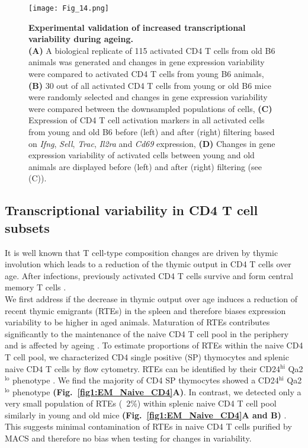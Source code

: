 \newpage

\begin{figure}[!ht]
\centering
\texttt{[image: Fig\_14.png]}
\caption[Experimental validation of increased transcriptional variability during ageing]{\textbf{Experimental validation of increased transcriptional variability during ageing.} \\
\textbf{(A)} A biological replicate of 115 activated CD4\plus{} T cells from old B6 animals was generated and changes in gene expression variability were compared to activated CD4\plus{} T cells from young B6 animals, \textbf{(B)} 30 out of all activated CD4\plus{} T cells from young or old B6 mice were randomly selected and changes in gene expression variability were compared between the downsampled populations of cells, \textbf{(C)} Expression of CD4\plus{} T cell activation markers in all activated cells from young and old B6 before (left) and after (right) filtering based on \textit{Ifng}, \textit{Sell}, \textit{Trac}, \textit{Il2ra} and \textit{Cd69} expression, \textbf{(D)} Changes in gene expression variability of activated cells between young and old animals are displayed before (left) and after (right) filtering (see (C)).}
\label{fig1:validation}
\end{figure}

\newpage

\subsection{Transcriptional variability in CD4\plus{} T cell subsets}

It is well known that T cell-type composition changes are driven by thymic involution which leads to a reduction of the thymic output in CD4\plus{} T cells over age. After infections, previously activated CD4\plus{} T cells survive and form central memory T cells \cite{Moro-Garcia2013}.\\

We first address if the decrease in thymic output over age induces a reduction of recent thymic emigrants (RTEs) in the spleen and therefore biases expression variability to be higher in aged animals. Maturation of RTEs contributes significantly to the maintenance of the naive CD4\plus{} T cell pool in the periphery and is affected by ageing \citep{Boursalian2004, Hale2006, Fink2013}. To estimate proportions of RTEs within the naive CD4\plus{} T cell pool, we characterized CD4 single positive (SP) thymocytes and splenic naive CD4\plus{} T cells by flow cytometry.  RTEs can be identified by their CD24$^{\text{hi}}$ Qa2$^{\text{lo}}$ phenotype \citep{Boursalian2004, Hale2006}. We find the  majority of CD4 SP thymocytes showed a CD24$^\text{hi}$ Qa2$^\text{lo}$ phenotype \textbf{(Fig.~\ref{fig1:EM_Naive_CD4}A)}. In contrast, we detected only a very small population of RTEs (~2\%) within splenic naive CD4\plus{} T cell pool similarly in young and old mice \textbf{(Fig.~\ref{fig1:EM_Naive_CD4}A and B)} \citep{Hale2006}. This suggests minimal contamination of RTEs in naive CD4\plus{} T cells purified by MACS and therefore no bias when testing for changes in variability.\\

